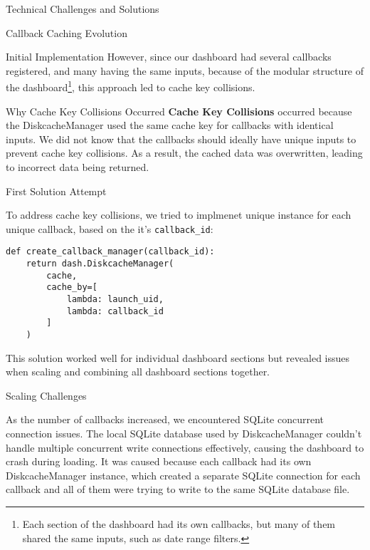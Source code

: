 \begin{section}{Technical Challenges and Solutions}
\begin{subsection}{Callback Caching Evolution}
\begin{subsubsection}{Initial Implementation}
			However, since our dashboard had several callbacks registered, and many having the same inputs, because of the modular structure of the dashboard\footnote{
				Each section of the dashboard had its own callbacks, but many of them shared the same inputs, such as date range filters.
			}, this approach led to cache key collisions.

			\begin{infobox}{Why Cache Key Collisions Occurred}
				\textbf{Cache Key Collisions} occurred because the DiskcacheManager used the same cache key for callbacks with identical inputs.
				We did not know that the callbacks should ideally have unique inputs to prevent cache key collisions.
				As a result, the cached data was overwritten, leading to incorrect data being returned.
			\end{infobox}
		\end{subsubsection}

		\begin{subsubsection}{First Solution Attempt}
			\label{subsubsec:implementation-technical-challenges-caching-first}

			To address cache key collisions, we tried to implmenet unique  instance for each unique callback, based on the it's \texttt{callback_id}:

			\begin{listing}[H]
				\caption{Unique Cache Managers Per Callback}
				\begin{verbatim}
def create_callback_manager(callback_id):
    return dash.DiskcacheManager(
        cache,
        cache_by=[
            lambda: launch_uid,
            lambda: callback_id
        ]
    )
				\end{verbatim}
				\label{lst:dashboard-implementation-cache-unique}
			\end{listing}

			This solution worked well for individual dashboard sections but revealed issues when scaling and combining all dashboard sections together.
		\end{subsubsection}

		\begin{subsubsection}{Scaling Challenges}
			\label{subsubsec:implementation-technical-challenges-caching-scaling}

			As the number of callbacks increased, we encountered SQLite concurrent connection issues.
			The local SQLite database used by DiskcacheManager\cite{gj_diskcache} couldn't handle multiple concurrent write connections effectively, causing the dashboard to crash during loading.
			It was caused because each callback had its own DiskcacheManager instance, which created a separate SQLite connection for each callback and all of them were trying to write to the same SQLite database file.


\end{subsubsection}
\end{subsection}
\end{section}
